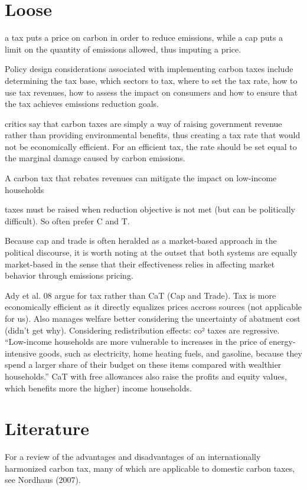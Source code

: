 \documentclass[version=3.21, pagesize, twoside=off, bibliography=totoc, DIV=calc, fontsize=12pt, a4paper, french, english]{scrartcl}
\begin{document}
\section{Loose}
a tax puts a price on carbon in order to reduce emissions, while a cap puts a limit on the quantity of emissions allowed, thus imputing a price.

Policy design considerations associated with implementing carbon taxes
include determining the tax base, which sectors to tax, where to set the tax rate, how to use tax
revenues, how to assess the impact on consumers and how to ensure that the tax achieves emissions
reduction goals.

critics say that carbon taxes are simply a way of raising government
revenue rather than providing environmental benefits, thus creating a tax rate that would not be economically efficient. For an efficient tax, the rate should be set equal to the marginal damage caused by
carbon emissions.

A carbon tax that rebates revenues can mitigate the impact on low-income households

taxes must be raised when reduction objective is not met (but can be politically difficult). So often prefer C and T.

Because cap and trade is often heralded as a market-based approach in the
political discourse, it is worth noting at the outset that both systems are equally market-based in
the sense that their effectiveness relies in affecting market behavior through emissions pricing.

Ady et al. 08 argue for tax rather than CaT (Cap and Trade). Tax is more economically efficient as it directly equalizes prices accross sources (not applicable for us). Also manages welfare better considering the uncertainty of abatment cost (didn’t get why). Considering redistribution effects: co² taxes are regressive. “Low-income households are more vulnerable to increases in the price of energy-intensive
goods, such as electricity, home heating fuels, and gasoline, because they spend a larger share of
their budget on these items compared with wealthier households.” CaT with free allowances also raise the profits and equity values, which benefits more the higher) income households.

\section{Literature}
For a review of
the advantages and disadvantages of an internationally harmonized carbon tax, many of which are
applicable to domestic carbon taxes, see Nordhaus (2007).
\end{document}
